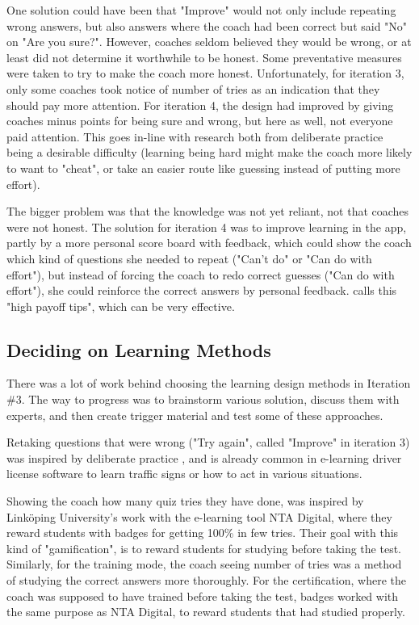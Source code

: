   One solution could have been that "Improve" would not only include repeating wrong answers, but also answers where the coach had been correct but said "No" on "Are you sure?". However, coaches seldom believed they would be wrong, or at least did not determine it worthwhile to be honest. Some preventative measures were taken to try to make the coach more honest. Unfortunately, for iteration 3, only some coaches took notice of number of tries as an indication that they should pay more attention. For iteration 4, the design had improved by giving coaches minus points for being sure and wrong, but here as well, not everyone paid attention. This goes in-line with research both from deliberate practice being a desirable difficulty (learning being hard might make the coach more likely to want to "cheat", or take an easier route like guessing instead of putting more effort).

  The bigger problem was that the knowledge was not yet reliant, not that coaches were not honest. The solution for iteration 4 was to improve learning in the app, partly by a more personal score board with feedback, which could show the coach which kind of questions she needed to repeat ("Can't do" or "Can do with effort"), but instead of forcing the coach to redo correct guesses ("Can do with effort"), she could reinforce the correct answers by personal feedback. \cite{sierra} calls this "high payoff tips", which can be very effective.

  \subsection{Deciding on Learning Methods}
  There was a lot of work behind choosing the learning design methods in Iteration \#3. The way to progress was to brainstorm various solution, discuss them with experts, and then create trigger material and test some of these approaches.

  Retaking questions that were wrong ("Try again", called "Improve" in iteration 3) was inspired by deliberate practice \cite{sierra}, and is already common in e-learning driver license software to learn traffic signs or how to act in various situations.

  Showing the coach how many quiz tries they have done, was inspired by Linköping University's work with the e-learning tool NTA Digital, where they reward students with badges for getting 100\% in few tries. Their goal with this kind of "gamification", is to reward students for studying before taking the test. Similarly, for the training mode, the coach seeing number of tries was a method of studying the correct answers more thoroughly. For the certification, where the coach was supposed to have trained before taking the test, badges worked with the same purpose as NTA Digital, to reward students that had studied properly.


